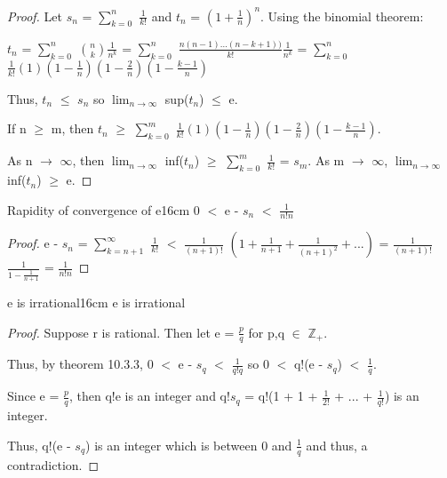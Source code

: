     \begin{proof}
        Let $s_n$ = $\sum_{k=0}^n$ $\frac{1}{k!}$ and
        $t_n$ = $(1 + \frac{1}{n})^n$.
        Using the binomial theorem:

        \hspace{1cm}
        $t_n$ = $\sum_{k=0}^n$ $\binom{n}{k} \frac{1}{n^k}$
        = $\sum_{k=0}^n$ $\frac{n(n-1)...(n-k+1))}{k!} \frac{1}{n^k}$
        = $\sum_{k=0}^n$ $\frac{1}{k!}
                        (1) (1 - \frac{1}{n}) (1 - \frac{2}{n}) (1 - \frac{k-1}{n})$
        
        Thus, $t_n$ $\leq$ $s_n$ so
        $\lim_{n \rightarrow \infty}$ sup($t_n$) $\leq$ e.

        If n $\geq$ m, then
        $t_n$ $\geq$
        $\sum_{k=0}^m$ $\frac{1}{k!}
                        (1) (1 - \frac{1}{n}) (1 - \frac{2}{n}) (1 - \frac{k-1}{n})$.
        
        As n $\rightarrow$ $\infty$, then
        $\lim_{n \rightarrow \infty}$ inf($t_n$)
        $\geq$ $\sum_{k=0}^m$ $\frac{1}{k!}$
        = $s_m$.
        As m $\rightarrow$ $\infty$,
        $\lim_{n \rightarrow \infty}$ inf($t_n$) $\geq$ e.
    \end{proof}

    \vspace{0.5cm}



    \begin{wtheorem}{Rapidity of convergence of e}{16cm}
        0 $<$ e - $s_n$ $<$ $\frac{1}{n!n}$
    \end{wtheorem}

    \begin{proof}
        e - $s_n$
        = $\sum_{k=n+1}^{\infty}$ $\frac{1}{k!}$
        $<$ $\frac{1}{(n+1)!}$ $(1 + \frac{1}{n+1} + \frac{1}{(n+1)^2} + ...)$
        = $\frac{1}{(n+1)!}$ $\frac{1}{1 - \frac{1}{n+1}}$
        = $\frac{1}{n!n}$
    \end{proof}

    \newpage



    \begin{wtheorem}{e is irrational}{16cm}
        e is irrational
    \end{wtheorem}

    \begin{proof}
        Suppose r is rational.
        Then let e = $\frac{p}{q}$ for p,q $\in$ $\mathbb{Z}_+$.

        Thus, by {\color{red} theorem 10.3.3},
        0 $<$ e - $s_q$ $<$ $\frac{1}{q!q}$ so
        0 $<$ q!(e - $s_q$) $<$ $\frac{1}{q}$.

        Since e = $\frac{p}{q}$, then q!e is an integer and
        q!$s_q$ = q!(1 + 1 + $\frac{1}{2!}$ + ... + $\frac{1}{q!}$)
        is an integer.
        
        Thus, q!(e - $s_q$) is an integer which is between 0 and $\frac{1}{q}$
        and thus, a contradiction.
    \end{proof}

